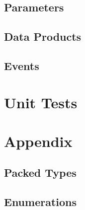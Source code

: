 

\subsection{Parameters}



\subsection{Data Products}



\subsection{Events}



\section{Unit Tests}



\section{Appendix}
\subsection{Packed Types}



\subsection{Enumerations}




